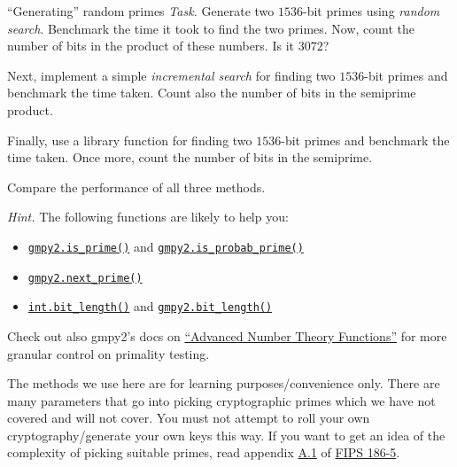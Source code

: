 \documentclass{practice}
\begin{document}
\begin{task}{\enquote{Generating} random primes}
  \textit{Task.}
  Generate two $1536$-bit primes using \emph{random search}.
  Benchmark the time it took to find the two primes.
  Now, count the number of bits in the product of these numbers.
  Is it $3072$?

  Next, implement a simple \emph{incremental search} for finding two $1536$-bit primes and benchmark the time taken.
  Count also the number of bits in the semiprime product.

  Finally, use a library function for finding two $1536$-bit primes and benchmark the time taken.
  Once more, count the number of bits in the semiprime.

  Compare the performance of all three methods.

  \textit{Hint.}
  The following functions are likely to help you:
  \begin{itemize}
    \item \href{https://gmpy2.readthedocs.io/en/latest/mpz.html#gmpy2.mpz.is_prime}{\texttt{gmpy2.is\_prime()}} and \href{https://gmpy2.readthedocs.io/en/latest/mpz.html#gmpy2.mpz.is_probab_prime}{\texttt{gmpy2.is\_probab\_prime()}}
    \item \href{https://gmpy2.readthedocs.io/en/latest/mpz.html#gmpy2.next_prime}{\texttt{gmpy2.next\_prime()}}
    \item \href{https://docs.python.org/3/library/stdtypes.html#int.bit_length}{\texttt{int.bit\_length()}} and \href{https://gmpy2.readthedocs.io/en/latest/mpz.html#gmpy2.bit_length}{\texttt{gmpy2.bit\_length()}}
  \end{itemize}

  Check out also gmpy2's docs on \href{https://gmpy2.readthedocs.io/en/latest/advmpz.html#advanced-number-theory-functions}{\enquote{Advanced Number Theory Functions}} for more granular control on primality testing.

  \begin{tcolorbox}[title=Warning]
    The methods we use here are for learning purposes/convenience only.
    There are many parameters that go into picking cryptographic primes which we have not covered and will not cover.
    You must not attempt to roll your own cryptography/generate your own keys this way.
    \tcblower
    If you want to get an idea of the complexity of picking suitable primes, read appendix \href{https://nvlpubs.nist.gov/nistpubs/FIPS/NIST.FIPS.186-5.pdf#page=42}{A.1} of \href{https://csrc.nist.gov/pubs/fips/186-5/final}{FIPS 186-5}.
  \end{tcolorbox}
\end{task}
\end{document}

